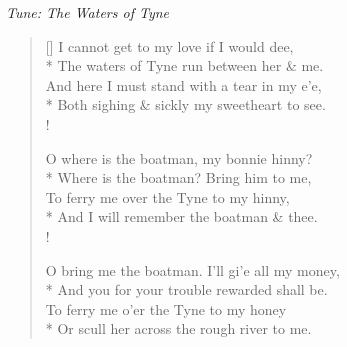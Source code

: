 \documentclass[MAIN]{subfiles}
\begin{document}
\bigskip

\begin{center}
{\it Tune: The Waters of Tyne}
\end{center}

\bigskip

\settowidth{\versewidth}{O bring me the boatman. I'll gi'e all my money,}
\begin{verse}[\versewidth]
I cannot get to my love if I would dee,\\*
\vin The waters of {\sc Tyne} run between her \& me.\\
And here I must stand with a tear in my e'e,\\*
\vin Both sighing \& sickly my sweetheart to see.\\!

O where is the boatman, my bonnie hinny?\\*
\vin Where is the boatman? Bring him to me,\\
To ferry me over the {\sc Tyne} to my hinny,\\*
\vin And I will remember the boatman \& thee.\\!

O bring me the boatman. I'll gi'e all my money,\\*
\vin And you for your trouble rewarded shall be.\\
To ferry me o'er the {\sc Tyne} to my honey\\*
\vin Or scull her across the rough river to me.
\end{verse}
\end{document}
